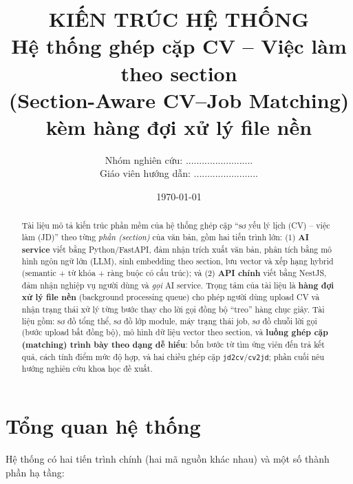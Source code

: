 \documentclass[a4paper,11pt]{article}
\title{\textbf{KIẾN TRÚC HỆ THỐNG}\\[4pt]
       \large Hệ thống ghép cặp CV -- Việc làm theo section\\
       \normalsize (Section-Aware CV--Job Matching) kèm hàng đợi xử lý file nền}
\author{Nhóm nghiên cứu: .........................\\
        \small Giáo viên hướng dẫn: ........................}
\date{\today}
\begin{document}
\maketitle

\begin{abstract}
\noindent Tài liệu mô tả kiến trúc phần mềm của hệ thống ghép cặp ``sơ yếu lý lịch (CV) --
việc làm (JD)'' theo từng \emph{phần (section)} của văn bản, gồm hai tiến trình lớn:
(1) \textbf{AI service} viết bằng Python/FastAPI, đảm nhận trích xuất văn bản, phân tích
bằng mô hình ngôn ngữ lớn (LLM), sinh embedding theo section, lưu vector và xếp hạng
hybrid (semantic + từ khóa + ràng buộc có cấu trúc); và (2) \textbf{API chính} viết bằng
NestJS, đảm nhận nghiệp vụ người dùng và \emph{gọi} AI service. Trọng tâm của tài liệu là
\textbf{hàng đợi xử lý file nền} (background processing queue) cho phép người dùng upload
CV và nhận trạng thái xử lý từng bước thay cho lời gọi đồng bộ ``treo'' hàng chục giây.
Tài liệu gồm: sơ đồ tổng thể, sơ đồ lớp module, máy trạng thái job, sơ đồ chuỗi lời gọi
(bước upload bất đồng bộ), mô hình dữ liệu vector theo section, và \textbf{luồng ghép cặp
(matching) trình bày theo dạng dễ hiểu}: bốn bước từ tìm ứng viên đến trả kết quả, cách
tính điểm mức độ hợp, và hai chiều ghép cặp \texttt{jd2cv}/\texttt{cv2jd}; phần cuối nêu
hướng nghiên cứu khoa học đề xuất.
\end{abstract}

\tableofcontents

\section{Tổng quan hệ thống}

Hệ thống có hai tiến trình chính (hai mã nguồn khác nhau) và một số thành phần hạ tầng:
\end{document}
